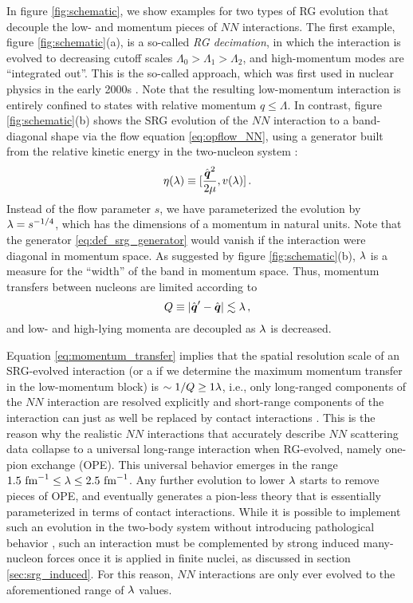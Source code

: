 In figure \ref{fig:schematic}, we show examples for two types of RG evolution
that decouple the low- and momentum pieces of $NN$ interactions. The first
example, figure \ref{fig:schematic}(a), is a so-called  \emph{RG decimation}, 
in which the interaction is evolved to decreasing cutoff scales $\Lambda_0 > \Lambda_1 > \Lambda_2$, 
and high-momentum modes are ``integrated out''. This is the so-called \Vlowk{}
approach, which was first used in nuclear physics in the early 2000s 
\cite{Bogner:2003os,Bogner:2010pq}. Note that the resulting low-momentum 
interaction is entirely confined to states with relative momentum $q\leq\Lambda$.
In contrast, figure \ref{fig:schematic}(b) shows the SRG evolution of the $NN$ interaction
to a band-diagonal shape via the flow equation \eqref{eq:opflow_NN}, using a 
generator built from the relative kinetic energy in the two-nucleon system \cite{Bogner:2007od,Bogner:2010pq}:
\begin{equation}\label{eq:def_srg_generator}
  \eta(\lambda) \equiv \comm{\frac{\qOV^2}{2\mu}}{v(\lambda)}\,.
\end{equation}
Instead of the flow parameter $s$, we have parameterized the evolution by 
$\lambda=s^{-1/4}$, which has the dimensions of a momentum in natural units. 
Note that the generator \eqref{eq:def_srg_generator} would vanish if the
interaction were diagonal in momentum space. As suggested by figure 
\ref{fig:schematic}(b), $\lambda$ is a measure for the ``width'' of the 
band in momentum space. Thus, momentum transfers between nucleons are limited 
according to
\begin{equation}\label{eq:momentum_transfer}
  Q\equiv |\qOV' - \qOV| \lesssim \lambdaSRG\,,
\end{equation} 
and low- and high-lying momenta are decoupled as $\lambda$ is decreased. 

Equation \eqref{eq:momentum_transfer} implies that the spatial resolution scale
of an SRG-evolved interaction (or a \Vlowk{} if we determine the maximum
momentum transfer in the low-momentum block) is $\sim 1/Q \geq 1\lambda$,
i.e., only long-ranged components of the $NN$ interaction are resolved explicitly
and short-range components of the interaction can just as well be replaced 
by contact interactions \cite{Lepage:1997py,Bogner:2003os,Holt:2004ux,Bogner:2010pq}.
This is the reason why the realistic $NN$ interactions that accurately 
describe $NN$ scattering data collapse to a universal long-range interaction
when RG-evolved, namely one-pion exchange (OPE). This universal behavior emerges
in the range $1.5\,\,\text{fm}^{-1}\leq\lambda\leq2.5\,\,\text{fm}^{-1}$. Any further evolution to
lower $\lambda$ starts to remove pieces of OPE, and eventually generates a 
pion-less theory that is essentially parameterized in terms of contact 
interactions. While it is possible to implement such an evolution in
the two-body system without introducing pathological behavior \cite{Wendt:2011ys},
such an interaction must be complemented by strong induced many-nucleon
forces once it is applied in finite nuclei, as discussed in section \ref{sec:srg_induced}.
For this reason, $NN$ interactions are only ever evolved to the aforementioned
range of $\lambda$ values.

